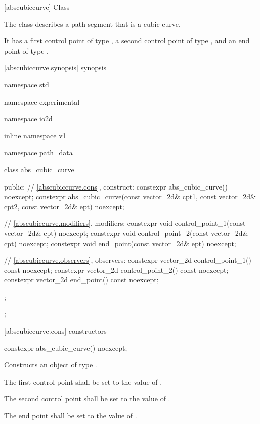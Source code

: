  [abscubiccurve] {Class }

\pnum
{}
The class  describes a path segment that is a cubic \bezierlocal curve.

\pnum
It has a first control point of type , a second control point of type , and an end point of type .

 [abscubiccurve.synopsis] { synopsis}

\begin{codeblock}
namespace std { namespace experimental { namespace io2d { inline namespace v1 {
  namespace path_data {
    class abs_cubic_curve {
    public:
      // \ref{abscubiccurve.cons}, construct:
      constexpr abs_cubic_curve() noexcept;
      constexpr abs_cubic_curve(const vector_2d& cpt1, const vector_2d& cpt2,
        const vector_2d& ept) noexcept;

      // \ref{abscubiccurve.modifiers}, modifiers:
      constexpr void control_point_1(const vector_2d& cpt) noexcept;
      constexpr void control_point_2(const vector_2d& cpt) noexcept;
      constexpr void end_point(const vector_2d& ept) noexcept;


      // \ref{abscubiccurve.observers}, observers:
      constexpr vector_2d control_point_1() const noexcept;
      constexpr vector_2d control_point_2() const noexcept;
      constexpr vector_2d end_point() const noexcept;
    };
  };
} } } }
\end{codeblock}

 [abscubiccurve.cons] { constructors}

\begin{itemdecl}
constexpr abs_cubic_curve() noexcept;
\end{itemdecl}
\begin{itemdescr}
\pnum
\effects
Constructs an object of type .

\pnum
The first control point shall be set to the value of .

\pnum
The second control point shall be set to the value of .

\pnum
The end point shall be set to the value of .
\end{itemdescr}

